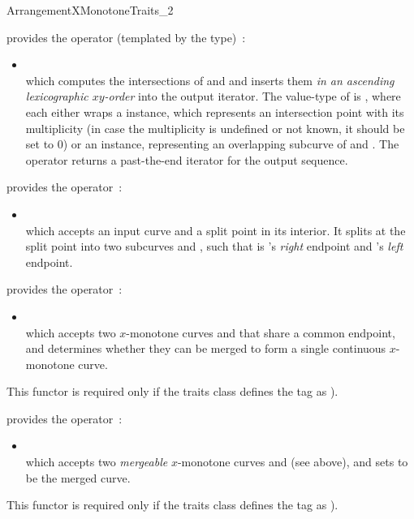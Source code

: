 \begin{ccRefConcept}{ArrangementXMonotoneTraits_2}
{provides the operator (templated by the  type)~:
 \begin{itemize}
 \item {} \\
 which computes the intersections of  and  and inserts them
 {\sl in an ascending lexicographic $xy$-order} into the output iterator.
 The value-type of  is , where each
  either wraps a  instance, which
 represents an intersection point with its multiplicity (in case the
 multiplicity is undefined or not known, it should be set to $0$) or an
  instance, representing an overlapping subcurve of
  and . The operator returns a past-the-end iterator
 for the output sequence.
 \end{itemize}}

{provides the operator~:
 \begin{itemize}
 \item {} \\
 which accepts an input curve  and a split point  in its
 interior. It splits  at the split point into two subcurves 
 and , such that  is 's {\sl right} endpoint and
 's {\sl left} endpoint.
 \end{itemize}} 

{provides the operator~:
 \begin{itemize}
 \item {} \\
 which accepts two $x$-monotone curves  and  that share
 a common endpoint, and determines whether they can be merged to form a single
 continuous $x$-monotone curve.
 \end{itemize}
 This functor is required only if the traits class defines the
  tag as ).}

{provides the operator~:
 \begin{itemize}
 \item {} \\
 which accepts two {\sl mergeable} $x$-monotone curves  and 
 (see above), and sets  to be the merged curve.
 \end{itemize}
 This functor is required only if the traits class defines the
  tag as ).} 


\end{ccRefConcept}
